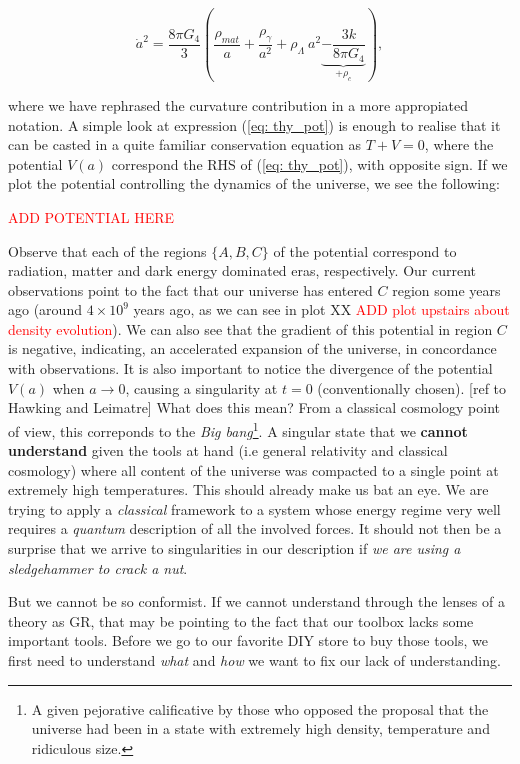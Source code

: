 \documentclass[11pt, a4paper]{article} %
\begin{document}
\begin{equation}\label{eq: thy_pot}
	\dot{a}^{2} = \frac{8 \pi G_{4}}{3} \left(\frac{\rho_{mat}}{a} + \frac{\rho_{\gamma}}{a^{2}} + \rho_{\Lambda} \:a^{2}\underbrace{- \frac{3 k}{8 \pi G_{4}}}_{+\rho_{c}}\right),
\end{equation}

where we have rephrased the curvature contribution in a more appropiated notation. A simple look at expression (\ref{eq: thy_pot}) is enough to realise that it can be casted in a quite familiar conservation equation as $T + V = 0$, where the potential $V(a)$ correspond the RHS of (\ref{eq: thy_pot}), with opposite sign. If we plot the potential controlling the dynamics of the universe, we see the following:

\textcolor{red}{ADD POTENTIAL HERE}

Observe that each of the regions $\{A, B, C\}$ of the potential correspond to radiation, matter and dark energy dominated eras, respectively. Our current observations point to the fact that our universe has entered $C$ region some years ago (around $4\times 10^{9}$ years ago, as we can see in plot XX \textcolor{red}{ADD plot upstairs about density evolution}). We can also see that the gradient of this potential in region $C$ is negative, indicating, an accelerated expansion of the universe, in concordance with observations. It is also important to notice the divergence of the potential $V(a)$ when $a \rightarrow 0$, causing a singularity at $t=0$ (conventionally chosen). [ref to Hawking and Leimatre] What does this mean? From a classical cosmology point of view, this correponds to the \textit{Big bang}\footnote{A given pejorative calificative by those who opposed the proposal that the universe had been in a state with extremely high density, temperature and ridiculous size.}. A singular state that we \textbf{cannot understand} given the tools at hand (i.e general relativity and classical cosmology) where all content of the universe was compacted to a single point at extremely high temperatures. This should already make us bat an eye. We are trying to apply a \textit{classical} framework to a system whose energy regime very well requires a \textit{quantum} description of all the involved forces. It should not then be a surprise that we arrive to singularities in our description if \textit{we are using a sledgehammer to crack a nut}.

But we cannot be so conformist. If we cannot understand through the lenses of a theory as GR, that may be pointing to the fact that our toolbox lacks some important tools. Before we go to our favorite DIY store to buy those tools, we first need to understand \textit{what} and \textit{how} we want to fix our lack of understanding.
\end{document}
